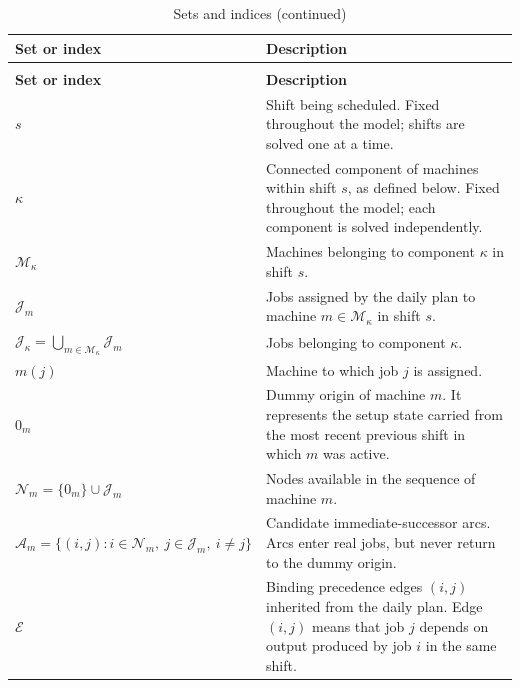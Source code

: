 \documentclass{article}
\begin{document}
\begin{longtable}{@{}L{0.30\textwidth}L{0.64\textwidth}@{}}
\caption{Sets and indices}
\label{tab:seq-sets} \\

\toprule
\textbf{Set or index} & \textbf{Description} \\
\midrule
\endfirsthead

\caption[]{Sets and indices (continued)} \\
\toprule
\textbf{Set or index} & \textbf{Description} \\
\midrule
\endhead

\bottomrule
\endlastfoot

$s$ & Shift being scheduled. Fixed throughout the model; shifts are solved one at a time. \\

$\kappa$ & Connected component of machines within shift $s$, as defined below. Fixed throughout the model; each component is solved independently. \\

$\mathcal{M}_{\kappa}$ & Machines belonging to component $\kappa$ in shift $s$. \\

$\mathcal{J}_{m}$ & Jobs assigned by the daily plan to machine $m \in \mathcal{M}_{\kappa}$ in shift $s$. \\

$\mathcal{J}_{\kappa}=\bigcup_{m\in\mathcal{M}_{\kappa}}\mathcal{J}_{m}$ & Jobs belonging to component $\kappa$. \\

$m(j)$ & Machine to which job $j$ is assigned. \\

$0_m$ & Dummy origin of machine $m$. It represents the setup state carried from the most recent previous shift in which $m$ was active. \\

$\mathcal{N}_{m}=\{0_m\}\cup\mathcal{J}_{m}$ & Nodes available in the sequence of machine $m$. \\

$\mathcal{A}_{m}=\{(i,j): i\in\mathcal{N}_{m},\ j\in\mathcal{J}_{m},\ i\neq j\}$ & Candidate immediate-successor arcs. Arcs enter real jobs, but never return to the dummy origin. \\

$\mathcal{E}$ & Binding precedence edges $(i,j)$ inherited from the daily plan. Edge $(i,j)$ means that job $j$ depends on output produced by job $i$ in the same shift. \\

\end{longtable}
\endgroup
\end{document}
